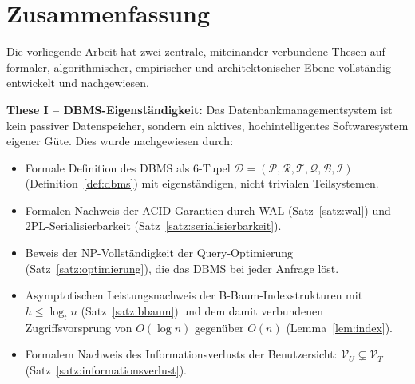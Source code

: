 ﻿\documentclass[a4paper,12pt]{article}
\theoremstyle{definition}
\begin{document}
\section{Zusammenfassung}
\label{sec:zusammenfassung}

Die vorliegende Arbeit hat zwei zentrale, miteinander verbundene Thesen auf formaler, algorithmischer, empirischer und architektonischer Ebene vollständig entwickelt und nachgewiesen.

\textbf{These I -- DBMS-Eigenständigkeit:} Das Datenbankmanagementsystem ist kein passiver Datenspeicher, sondern ein aktives, hochintelligentes Softwaresystem eigener Güte. Dies wurde nachgewiesen durch:
\begin{itemize}
  \item Formale Definition des DBMS als 6-Tupel $\mathcal{D} = (\mathcal{P}, \mathcal{R}, \mathcal{T}, \mathcal{Q}, \mathcal{B}, \mathcal{I})$ (Definition~\ref{def:dbms}) mit eigenständigen, nicht trivialen Teilsystemen.
  \item Formalen Nachweis der ACID-Garantien durch WAL (Satz~\ref{satz:wal}) und 2PL-Serialisierbarkeit (Satz~\ref{satz:serialisierbarkeit}).
  \item Beweis der NP-Vollständigkeit der Query-Optimierung (Satz~\ref{satz:optimierung}), die das DBMS bei jeder Anfrage löst.
  \item Asymptotischen Leistungsnachweis der B-Baum-Indexstrukturen mit $h \leq \log_t n$ (Satz~\ref{satz:bbaum}) und dem damit verbundenen Zugriffsvorsprung von $O(\log n)$ gegenüber $O(n)$ (Lemma~\ref{lem:index}).
  \item Formalem Nachweis des Informationsverlusts der Benutzersicht: $\mathcal{V}_U \subsetneq \mathcal{V}_T$ (Satz~\ref{satz:informationsverlust}).
\end{itemize}
\end{document}
